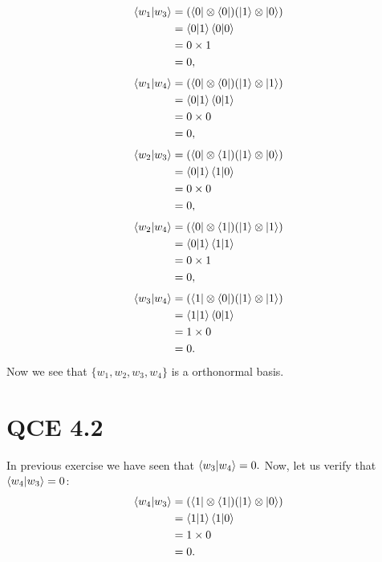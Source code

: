 \documentclass[10pt]{article}
\begin{document}
\begin{align*}
\braket{ w_1 | w_3  } &= ( \bra{ 0 } \otimes \bra{ 0 } ) ( \ket{ 1 } \otimes \ket{ 0 } ) \\
 					&= \braket{ 0 | 1 } \braket{ 0 | 0 } \\
 					&= 0 \times 1 \\
 					&= 0,
\end{align*}
\begin{align*}
\braket{ w_1 | w_4  } &= ( \bra{ 0 } \otimes \bra{ 0 } ) ( \ket{ 1 } \otimes \ket{ 1 } ) \\
 					&= \braket{ 0 | 1 } \braket{ 0 | 1 } \\
 					&= 0 \times 0 \\
 					&= 0,
\end{align*}
\begin{align*}
\braket{ w_2 | w_3  } &= ( \bra{ 0 } \otimes \bra{ 1 } ) ( \ket{ 1 } \otimes \ket{ 0 } ) \\
 					&= \braket{ 0 | 1 } \braket{ 1 | 0 } \\
 					&= 0 \times 0 \\
 					&= 0,
\end{align*}
\begin{align*}
\braket{ w_2 | w_4  } &= ( \bra{ 0 } \otimes \bra{ 1 } ) ( \ket{ 1 } \otimes \ket{ 1 } ) \\
 					&= \braket{ 0 | 1 } \braket{ 1 | 1 } \\
 					&= 0 \times 1 \\
 					&= 0,
\end{align*}
\begin{align*}
\braket{ w_3 | w_4  } &= ( \bra{ 1 } \otimes \bra{ 0 } ) ( \ket{ 1 } \otimes \ket{ 1 } ) \\
 					&= \braket{ 1 | 1 } \braket{ 0 | 1 } \\
 					&= 1 \times 0 \\
 					&= 0.
\end{align*}
Now we see that $\{ w_1, w_2, w_3, w_4 \}$ is a orthonormal basis.

\section*{QCE 4.2}
In previous exercise we have seen that $\braket{ w_3 | w_4 } = 0.$ Now, let us verify that $\braket{ w_4 | w_3 } = 0$:
\begin{align*}
\braket{ w_4 | w_3 } &= ( \bra{1} \otimes \bra{1} ) ( \ket{1} \otimes \ket{0} ) \\
								 &= \braket{ 1 | 1 } \braket{ 1 | 0 } \\
								 &= 1 \times 0 \\
								 &= 0.
\end{align*}
\end{document}
